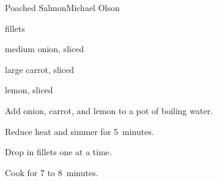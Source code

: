 \begin{recipe}{Poached Salmon}{Michael Olson}{}

\begin{ingredients}
\item {}  fillets
\item medium onion, sliced
\item large carrot, sliced
\item lemon, sliced
\end{ingredients}

\begin{directions}
\item Add onion, carrot, and lemon to a pot of boiling water.
\item Reduce heat and simmer for 5~minutes.
\item Drop in fillets one at a time.
\item Cook for 7 to 8~minutes.
\end{directions}

\end{recipe}
